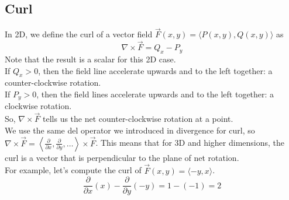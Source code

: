 \subsection{Curl}
\noindent
In 2D, we define the curl of a vector field $\vec{F}(x,y) = \langle P(x,y), Q(x,y) \rangle$ as
\begin{equation*}
	\nabla \times \vec{F} = Q_x - P_y
\end{equation*}
Note that the result is a scalar for this 2D case.\\
If $Q_x > 0$, then the field line accelerate upwards and to the left together: a counter-clockwise rotation.\\
If $P_y > 0$, then the field lines accelerate upwards and to the left together: a clockwise rotation.\\
So, $\nabla \times \vec{F}$ tells us the net counter-clockwise rotation at a point.\\

\noindent
We use the same del operator we introduced in divergence for curl, so $\nabla \times \vec{F} = \left< \frac{\partial}{\partial x}, \frac{\partial}{\partial y},\ldots \right> \times \vec{F}$. This means that for 3D and higher dimensions, the curl is a vector that is perpendicular to the plane of net rotation.\\

\noindent
For example, let's compute the curl of $\vec{F}(x,y) = \langle -y, x \rangle$.\\
\begin{equation*}
	\frac{\partial}{\partial x}(x) - \frac{\partial}{\partial y}(-y) = 1-(-1) = 2
\end{equation*}


